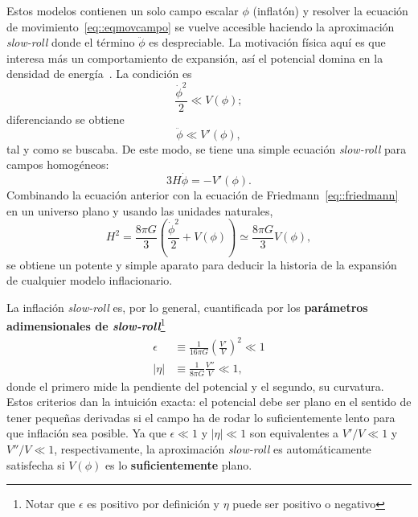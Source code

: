 Estos modelos contienen un solo campo escalar \(\phi\) (inflatón) y resolver la ecuación de movimiento~\eqref{eq::eqmovcampo} se vuelve accesible haciendo la aproximación \textit{slow-roll} donde el término \(\ddot{\phi}\) es despreciable. La motivación física aquí es que interesa más un comportamiento de expansión, así el potencial domina en la densidad de energía~\cite{peacock1998cosmological}. La condición es
\begin{equation}
    \frac{\dot{\phi}^2}{2}\ll V(\phi);
\end{equation}
diferenciando se obtiene
\begin{equation}
    \ddot{\phi}\ll V'(\phi),
\end{equation}
tal y como se buscaba. De este modo, se tiene una simple ecuación \textit{slow-roll} para campos homogéneos:
\begin{equation}
    3H\dot{\phi}=-V'(\phi).
\end{equation}
Combinando la ecuación anterior con la ecuación de Friedmann~\eqref{eq::friedmann} en un universo plano y usando las unidades naturales,
\begin{equation}
    H^2=\frac{8\pi G}{3}\left(\frac{\dot{\phi}^2}{2}+V(\phi)\right)\simeq \frac{8\pi G}{3}V(\phi),
\end{equation}
se obtiene un potente y simple aparato para deducir la historia de la expansión de cualquier modelo inflacionario.

La inflación \textit{slow-roll} es, por lo general, cuantificada por los \textbf{parámetros adimensionales de \textit{slow-roll}}\footnote{Notar que \(\epsilon\) es positivo por definición y \(\eta\) puede ser positivo o negativo}~\cite{liddle1998introduction}
\begin{subequations}
    \begin{align}
        \epsilon          & \equiv\frac{1}{16\pi G}\left(\frac{V'}{V}\right)^2\ll 1 \\
        \left|\eta\right| & \equiv\frac{1}{8\pi G}\frac{V''}{V}\ll 1,
    \end{align}
    \label{eq::slowroll}
\end{subequations}
donde el primero mide la pendiente del potencial y el segundo, su curvatura. Estos criterios dan la intuición exacta: el potencial debe ser plano en el sentido de tener pequeñas derivadas si el campo ha de rodar lo suficientemente lento para que inflación sea posible. Ya que \(\epsilon\ll 1\) y \(\left|\eta\right|\ll 1\) son equivalentes a \(V'/V\ll 1\) y \(V''/V\ll 1\), respectivamente, la aproximación \textit{slow-roll} es automáticamente satisfecha si \(V(\phi)\) es lo \textbf{suficientemente} plano.
